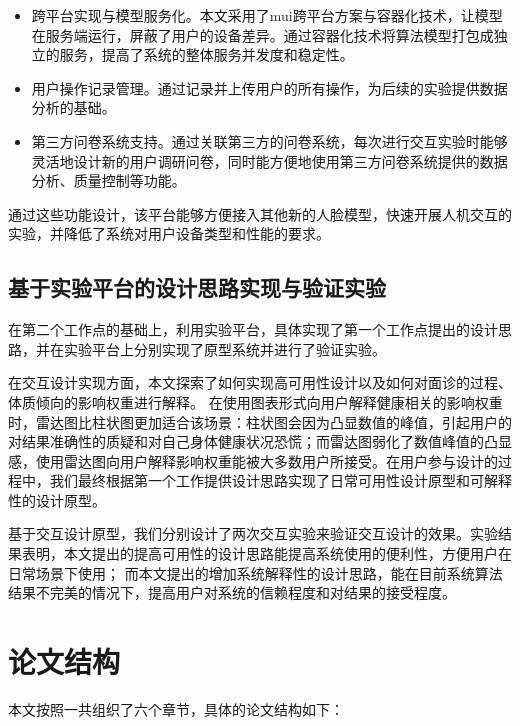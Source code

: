 \begin{itemize}

    \item 跨平台实现与模型服务化。本文采用了mui跨平台方案与容器化技术，让模型在服务端运行，屏蔽了用户的设备差异。通过容器化技术将算法模型打包成独立的服务，提高了系统的整体服务并发度和稳定性。

    \item 用户操作记录管理。通过记录并上传用户的所有操作，为后续的实验提供数据分析的基础。

    \item 第三方问卷系统支持。通过关联第三方的问卷系统，每次进行交互实验时能够灵活地设计新的用户调研问卷，同时能方便地使用第三方问卷系统提供的数据分析、质量控制等功能。

\end{itemize}

通过这些功能设计，该平台能够方便接入其他新的人脸模型，快速开展人机交互的实验，并降低了系统对用户设备类型和性能的要求。


\subsection{基于实验平台的设计思路实现与验证实验}


在第二个工作点的基础上，利用实验平台，具体实现了第一个工作点提出的设计思路，并在实验平台上分别实现了原型系统并进行了验证实验。

在交互设计实现方面，本文探索了如何实现高可用性设计以及如何对面诊的过程、体质倾向的影响权重进行解释。
在使用图表形式向用户解释健康相关的影响权重时，雷达图比柱状图更加适合该场景：柱状图会因为凸显数值的峰值，引起用户的对结果准确性的质疑和对自己身体健康状况恐慌；而雷达图弱化了数值峰值的凸显感，使用雷达图向用户解释影响权重能被大多数用户所接受。在用户参与设计的过程中，我们最终根据第一个工作提供设计思路实现了日常可用性设计原型和可解释性的设计原型。

基于交互设计原型，我们分别设计了两次交互实验来验证交互设计的效果。实验结果表明，本文提出的提高可用性的设计思路能提高系统使用的便利性，方便用户在日常场景下使用；
而本文提出的增加系统解释性的设计思路，能在目前系统算法结果不完美的情况下，提高用户对系统的信赖程度和对结果的接受程度。


\section{论文结构}
本文按照一共组织了六个章节，具体的论文结构如下：


